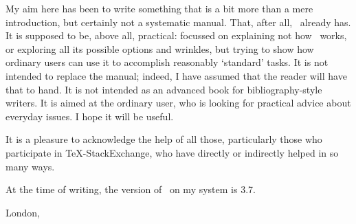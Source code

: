 My aim here has been to write something that is a bit more than a mere
introduction, but certainly not a systematic manual. That, after all,
\biblatex\ already has. It is supposed to be, above all, practical:
focussed on explaining not how \biblatex\ works, or exploring all its
possible options and wrinkles, but trying to show how ordinary users
can use it to accomplish reasonably `standard' tasks. It is not
intended to replace the manual; indeed, I have assumed that the reader
will have that to hand. It is not intended as an advanced book for
bibliography-style writers. It is aimed at the ordinary user, who is
looking for practical advice about everyday issues. I hope it will be
useful.

It is a pleasure to acknowledge the help of all those, particularly
those who participate in \TeX-StackExchange, who have directly or
indirectly helped in so many ways.

At the time of writing, the version of \biblatex\ on my system is 3.7.

\hfill{}

\hfill{London, \prefacedate}

